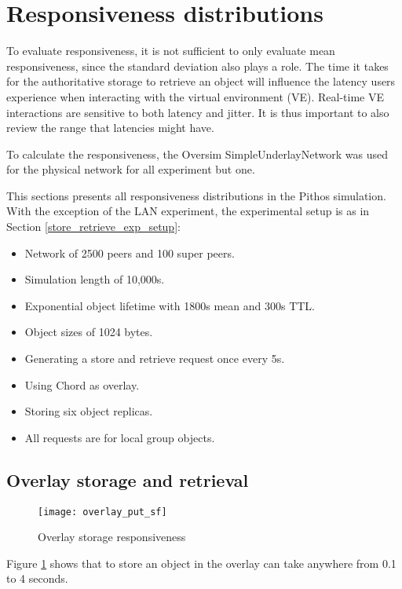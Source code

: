 \section{Responsiveness distributions}

To evaluate responsiveness, it is not sufficient to only evaluate mean responsiveness, since the standard deviation also plays a role. The time it takes for the authoritative storage to retrieve an object will influence the latency users experience when interacting with the virtual environment (VE). Real-time VE interactions are sensitive to both latency and jitter. It is thus important to also review the range that latencies might have.

To calculate the responsiveness, the Oversim SimpleUnderlayNetwork was used for the physical network for all experiment but one.

This sections presents all responsiveness distributions in the Pithos simulation. With the exception of the LAN experiment, the experimental setup is as in Section \ref{store_retrieve_exp_setup}:
%
\begin{itemize}
\item Network of 2500 peers and 100 super peers.
\item Simulation length of 10,000s.
\item Exponential object lifetime with 1800s mean and 300s TTL.
\item Object sizes of 1024 bytes.
\item Generating a store and retrieve request once every 5s.
\item Using Chord as overlay.
\item Storing six object replicas.
\item All requests are for local group objects.
\end{itemize}

\subsection{Overlay storage and retrieval}

\begin{figure}[htbp]
 \centering
 \texttt{[image: overlay\_put\_sf]}
 \caption{Overlay storage responsiveness}
 \label{fig_overlay_put_sf}
\end{figure}
%
Figure \ref{fig_overlay_put_sf} shows that to store an object in the overlay can take anywhere from 0.1 to 4 seconds.

